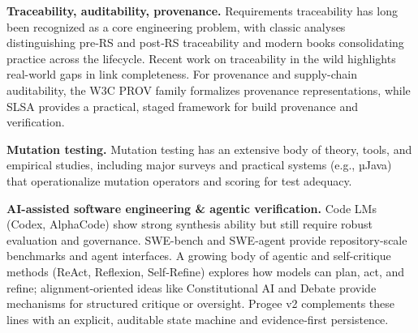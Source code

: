 \documentclass[11pt]{article}
\begin{document}
\textbf{Traceability, auditability, provenance.} Requirements traceability has long been recognized as a core engineering problem, with classic analyses distinguishing pre‑RS and post‑RS traceability and modern books consolidating practice across the lifecycle. Recent work on traceability in the wild highlights real-world gaps in link completeness. For provenance and supply-chain auditability, the W3C PROV family formalizes provenance representations, while SLSA provides a practical, staged framework for build provenance and verification.

\textbf{Mutation testing.} Mutation testing has an extensive body of theory, tools, and empirical studies, including major surveys and practical systems (e.g., µJava) that operationalize mutation operators and scoring for test adequacy.

\textbf{AI-assisted software engineering \& agentic verification.} Code LMs (Codex, AlphaCode) show strong synthesis ability but still require robust evaluation and governance. SWE-bench and SWE-agent provide repository-scale benchmarks and agent interfaces. A growing body of agentic and self-critique methods (ReAct, Reflexion, Self‑Refine) explores how models can plan, act, and refine; alignment‑oriented ideas like Constitutional AI and Debate provide mechanisms for structured critique or oversight. Progee v2 complements these lines with an explicit, auditable state machine and evidence‑first persistence.
\end{document}
